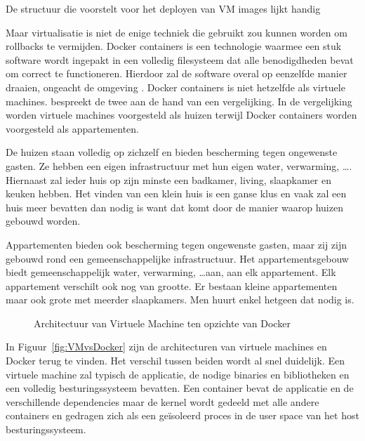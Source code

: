 De structuur die \citet{shumate2004implications} voorstelt voor het deployen van VM images lijkt handig


Maar virtualisatie is niet de enige techniek die gebruikt zou kunnen worden om rollbacks te vermijden.
Docker containers is een technologie waarmee een stuk software wordt ingepakt in een volledig filesysteem dat alle benodigdheden bevat om correct te functioneren.
Hierdoor zal de software overal op eenzelfde manier draaien, ongeacht de omgeving \citep{dockerMain}.
Docker containers is niet hetzelfde als virtuele machines.
\citet{dockerEbook} bespreekt de twee aan de hand van een vergelijking.
In de vergelijking worden virtuele machines voorgesteld als huizen terwijl Docker containers worden voorgesteld als appartementen.

De huizen staan volledig op zichzelf en bieden bescherming tegen ongewenste gasten.
Ze hebben een eigen infrastructuur met hun eigen water, verwarming, \ldots .
Hiernaast zal ieder huis op zijn minste een badkamer, living, slaapkamer en keuken hebben.
Het vinden van een klein huis is een ganse klus en vaak zal een huis meer bevatten dan nodig is want dat komt door de manier waarop huizen gebouwd worden.

Appartementen bieden ook bescherming tegen ongewenste gasten, maar zij zijn gebouwd rond een gemeenschappelijke infrastructuur.
Het appartementsgebouw biedt gemeenschappelijk water, verwarming, \ldots  aan, aan elk appartement.
Elk appartement verschilt ook nog van grootte.
Er bestaan kleine appartementen maar ook grote met meerder slaapkamers.
Men huurt enkel hetgeen dat nodig is.

\begin{figure}[!ht]
\centering
{}
\caption{Architectuur van Virtuele Machine ten opzichte van Docker \citep{dockerMain}}
\label{fig:VMvsDocker}
\end{figure}

In Figuur~\vref{fig:VMvsDocker} zijn de architecturen van virtuele machines en Docker terug te vinden.
Het verschil tussen beiden wordt al snel duidelijk.
Een virtuele machine zal typisch de applicatie, de nodige binaries en bibliotheken en een volledig besturingssysteem bevatten.
Een container bevat de applicatie en de verschillende dependencies maar de kernel wordt gedeeld met alle andere containers en gedragen zich als een geïsoleerd proces in de user space van het host besturingssysteem.

